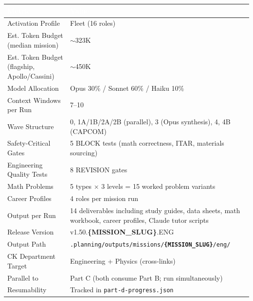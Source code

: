 \documentclass[11pt,letterpaper]{article}
\newcommand{\param}[1]{\textcolor{paramred}{\textbf{\{#1\}}}}
\newcommand{\tableheader}[1]{\textbf{\sffamily\textcolor{white}{#1}}}
\begin{document}
\begin{center}
\begin{tabularx}{\textwidth}{L{5.5cm}X}
\toprule
{}
\tableheader{Metric} & \tableheader{Value} \\
\midrule
Activation Profile & Fleet (16 roles) \\
Est. Token Budget (median mission) & $\sim$323K \\
Est. Token Budget (flagship, Apollo/Cassini) & $\sim$450K \\
Model Allocation & Opus 30\% / Sonnet 60\% / Haiku 10\% \\
Context Windows per Run & 7--10 \\
Wave Structure & 0, 1A/1B/2A/2B (parallel), 3 (Opus synthesis), 4, 4B (CAPCOM) \\
Safety-Critical Gates & 5 BLOCK tests (math correctness, ITAR, materials sourcing) \\
Engineering Quality Tests & 8 REVISION gates \\
Math Problems & 5 types $\times$ 3 levels = 15 worked problem variants \\
Career Profiles & 4 roles per mission run \\
Output per Run & 14 deliverables including study guides, data sheets, math workbook, career profiles, Claude tutor scripts \\
Release Version & v1.50.\param{MISSION\_SLUG}.ENG \\
Output Path & \texttt{.planning/outputs/missions/\param{MISSION\_SLUG}/eng/} \\
CK Department Target & Engineering + Physics (cross-links) \\
Parallel to & Part C (both consume Part B; run simultaneously) \\
Resumability & Tracked in \texttt{part-d-progress.json} \\
\bottomrule
\end{tabularx}
\end{center}

\vspace{2em}
\end{document}
